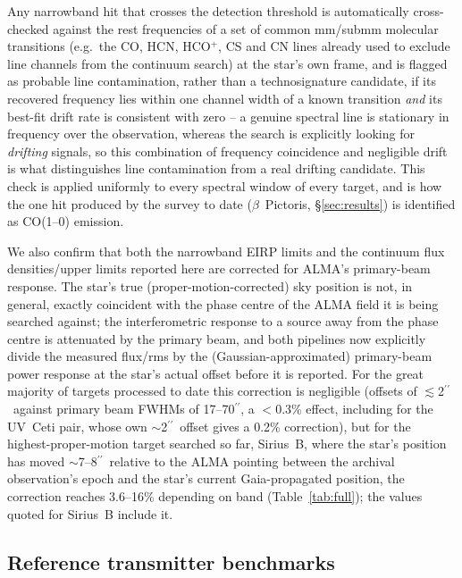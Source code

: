\documentclass{openjournal}
\begin{document}
Any narrowband hit that crosses the detection threshold is automatically
cross-checked against the rest frequencies of a set of common mm/submm
molecular transitions (e.g.\ the CO, HCN, HCO$^{+}$, CS and CN lines
already used to exclude line channels from the continuum search) at the
star's own frame, and is flagged as probable line contamination, rather
than a technosignature candidate, if its recovered frequency lies within
one channel width of a known transition \emph{and} its best-fit drift
rate is consistent with zero -- a genuine spectral line is stationary in
frequency over the observation, whereas the search is explicitly looking
for \emph{drifting} signals, so this combination of frequency
coincidence and negligible drift is what distinguishes line
contamination from a real drifting candidate. This check is applied
uniformly to every spectral window of every target, and is how the one
hit produced by the survey to date ($\beta$~Pictoris, \S\ref{sec:results})
is identified as CO(1--0) emission.

We also confirm that both the narrowband EIRP limits and the continuum
flux densities/upper limits reported here are corrected for ALMA's
primary-beam response. The star's true (proper-motion-corrected) sky
position is not, in general, exactly coincident with the phase centre of
the ALMA field it is being searched against; the interferometric
response to a source away from the phase centre is attenuated by the
primary beam, and both pipelines now explicitly divide the measured
flux/rms by the (Gaussian-approximated) primary-beam power response at
the star's actual offset before it is reported. For the great majority of
targets processed to date this correction is negligible (offsets of
$\lesssim$2\hbox{$^{\prime\prime}$}\ against primary beam FWHMs of
17--70\hbox{$^{\prime\prime}$}, a $<$0.3\% effect, including for the
UV~Ceti pair, whose own $\sim$2\hbox{$^{\prime\prime}$}\ offset gives a
0.2\% correction), but for the highest-proper-motion target searched so
far, Sirius~B, where the star's position has moved $\sim$7--8\hbox{$^{\prime\prime}$}\
relative to the ALMA pointing between the archival observation's epoch
and the star's current Gaia-propagated position, the correction reaches
3.6--16\% depending on band (Table~\ref{tab:full}); the values quoted
for Sirius~B include it.

\subsection{Reference transmitter benchmarks}
\label{sec:benchmarks}
\end{document}
